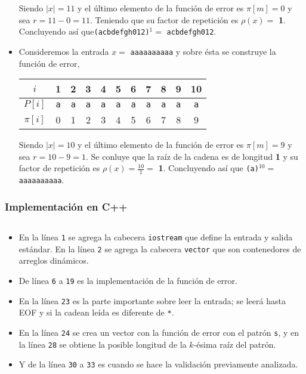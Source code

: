 \begin{itemize}
Siendo $\vert x \vert = 11$ y el último elemento de la función de error es $\pi[m] = 0$ y sea
$r = 11 - 0 = 11$. Teniendo que su factor de repetición es $\rho(x) = $ \textbf{1}. Concluyendo
así que\texttt{(acbdefgh012)}$^1 = $ \texttt{acbdefgh012}.

\item Consideremos la entrada $x =$ \texttt{aaaaaaaaaa} y sobre ésta se construye la función
de error, 
\begin{table}[h]
\centering
\begin{tabular}{c|c|c|c|c|c|c|c|c|c|c|}
\cline{2-11}
$i$      & 1          & 2          & 3          & 4          & 5          & 6          & 7          & 8          & 9          & 10         \\ \hline
$P[i]$   & \texttt{a} & \texttt{a} & \texttt{a} & \texttt{a} & \texttt{a} & \texttt{a} & \texttt{a} & \texttt{a} & \texttt{a} & \texttt{a} \\ \hline
$\pi[i]$ & 0          & 1          & 2          & 3          & 4          & 5          & 6          & 7          & 8          & 9          \\ \cline{2-11} 
\end{tabular}
\end{table}

Siendo $\vert x \vert = 10$ y el último elemento de la función de error es $\pi[m] = 9$ y sea
$r = 10 - 9 = 1$. Se conluye que la raíz de la cadena es de longitud \textbf{1} y su factor de
repetición es $\rho(x) = \frac{10}{1} =$ \textbf{1}. Concluyendo así que
\texttt{(a)}$^{10} = $ \texttt{aaaaaaaaaa}.
\end{itemize}
\newpage

\subsubsection{Implementación en C++}
\inputminted[linenos, frame=lines, fontsize=\footnotesize]{cpp}{problemas/cpp/FINDSR.cpp}

\begin{itemize}
\item En la línea \texttt{1} se agrega la cabecera \texttt{iostream} que define la entrada y salida
estándar. En la línea \texttt{2} se agrega la cabecera \texttt{vector} que son contenedores de
arreglos dinámicos.

\item De línea \texttt{6} a \texttt{19} es la implementación de la función de error.

\item En la línea \texttt{23} es la parte importante sobre leer la entrada; se leerá hasta EOF y si
la cadean leída es diferente de \texttt{*}.

\item En la línea \texttt{24} se crea un vector con la función de error con el patrón \texttt{s}, y
en la línea \texttt{28} se obtiene la posible longitud de la $k$-ésima raíz del patrón.

\item Y de la línea \texttt{30} a \texttt{33} es cuando se hace la validación previamente analizada.
\end{itemize}

